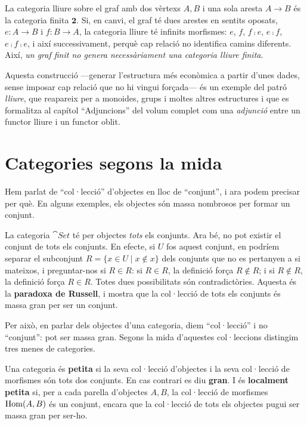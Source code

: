 \begin{exemple}
La categoria lliure sobre el graf amb dos vèrtexs $A,B$ i una sola aresta $A\to B$ és la categoria finita $\mathbf{2}$. Si, en canvi, el graf té dues arestes en sentits oposats, $e\colon A\to B$ i $f\colon B\to A$, la categoria lliure té infinits morfismes: $e$, $f$, $f\comp e$, $e\comp f$, $e\comp f\comp e$, i així successivament, perquè cap relació no identifica camins diferents. Així, \emph{un graf finit no genera necessàriament una categoria lliure finita}.
\end{exemple}

Aquesta construcció ---generar l'estructura més econòmica a partir d'unes dades, sense imposar cap relació que no hi vingui forçada--- és un exemple del patró \emph{lliure}, que reapareix per a monoides, grups i moltes altres estructures i que es formalitza al capítol \enquote{Adjuncions} del volum complet com una \emph{adjunció} entre un functor lliure i un functor oblit.

\section{Categories segons la mida}
\label{sec:mida}

Hem parlat de \enquote{col·lecció} d'objectes en lloc de \enquote{conjunt}, i ara podem precisar per què. En alguns exemples, els objectes són massa nombrosos per formar un conjunt.

\begin{observacio}
La categoria $\cat{Set}$ té per objectes \emph{tots} els conjunts. Ara bé, no pot existir el conjunt de tots els conjunts. En efecte, si $U$ fos aquest conjunt, en podríem separar el subconjunt $R=\{x\in U\mid x\notin x\}$ dels conjunts que no es pertanyen a si mateixos, i preguntar-nos si $R\in R$: si $R\in R$, la definició força $R\notin R$; i si $R\notin R$, la definició força $R\in R$. Totes dues possibilitats són contradictòries. Aquesta és la \textbf{paradoxa de Russell}, i mostra que la col·lecció de tots els conjunts és massa gran per ser un conjunt.
\end{observacio}

Per això, en parlar dels objectes d'una categoria, diem \enquote{col·lecció} i no \enquote{conjunt}: pot ser massa gran. Segons la mida d'aquestes col·leccions distingim tres menes de categories.

\begin{definicio}
Una categoria és \textbf{petita} si la seva col·lecció d'objectes i la seva col·lecció de morfismes són tots dos conjunts. En cas contrari es diu \textbf{gran}. I és \textbf{localment petita} si, per a cada parella d'objectes $A,B$, la col·lecció de morfismes $\operatorname{Hom}(A,B)$ és un conjunt, encara que la col·lecció de tots els objectes pugui ser massa gran per ser-ho.
\end{definicio}

